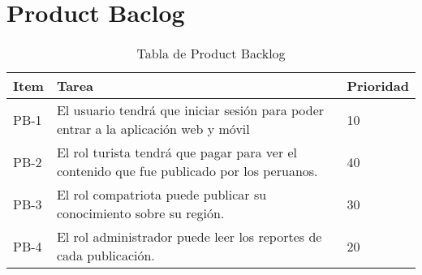 \chapter{Product Baclog}
\begin{table}[htbp]
	\begin{center}
		\begin{tabular}{|l|p{5cm}|l|}
			\hline
			Item & Tarea & Prioridad \\
			\hline \hline
			PB-1 & El usuario tendrá que iniciar sesión para poder entrar a la aplicación web y móvil			
			 & 10
			  \\ \hline
			PB-2 & El rol turista tendrá que pagar para ver el contenido que fue publicado por los peruanos. & 40		
			 \\ \hline
			PB-3 & El rol compatriota puede publicar su conocimiento sobre su región.			
			 & 30
			 \\ \hline
			PB-4 & El rol administrador puede leer los reportes de cada publicación.						
			& 20
			\\ \hline
		\end{tabular}
	\caption {Tabla de Product Backlog}
	\end{center}
\end{table}